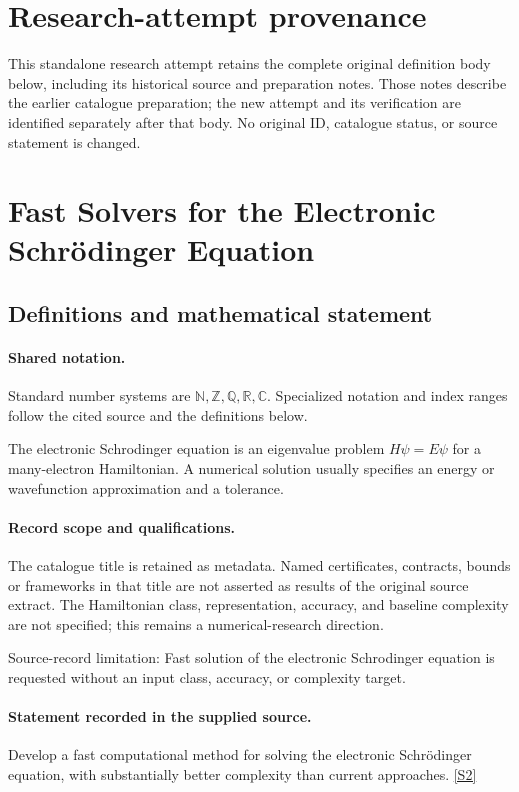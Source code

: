 \documentclass[11pt]{article}
\begin{document}
\section*{Research-attempt provenance}
This standalone research attempt retains the complete original definition body below,
including its historical source and preparation notes. Those notes describe the
earlier catalogue preparation; the new attempt and its verification are identified
separately after that body. No original ID, catalogue status, or source statement is changed.

\section{Fast Solvers for the Electronic Schrödinger Equation}\label{statement}

\subsection{Definitions and mathematical statement}

\paragraph{Shared notation.}Standard number systems are $\mathbb N,\mathbb Z,\mathbb Q,\mathbb R,\mathbb C$. Specialized notation and index ranges follow the cited source and the definitions below.


The electronic Schrodinger equation is an eigenvalue problem $H\psi=E\psi$ for a many-electron Hamiltonian. A numerical solution usually specifies an energy or wavefunction approximation and a tolerance.
\paragraph{Record scope and qualifications.}
The catalogue title is retained as metadata. Named certificates, contracts, bounds or frameworks in that title are not asserted as results of the original source extract.
The Hamiltonian class, representation, accuracy, and baseline complexity are not specified; this remains a numerical-research direction.

Source-record limitation: Fast solution of the electronic Schrodinger equation is requested without an input class, accuracy, or complexity target.
\paragraph{Statement recorded in the supplied source.}
Develop a fast computational method for solving the electronic Schrödinger equation, with substantially better complexity than current approaches. \href{https://doi.org/10.4171/owr/2011/32}{[S2]}
\end{document}
